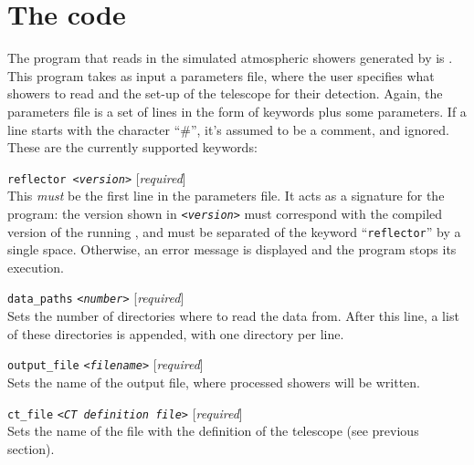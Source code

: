 \afterpage{\clearpage}

\clearpage

\section{The code }
\label{sec:reflector}
%
The program that reads in the simulated atmospheric showers generated
by \CORSIKA is . This program takes as input a parameters
file, where the user specifies what showers to read and the set-up of
the telescope for their detection. Again, the parameters file is a set
of lines in the form of keywords plus some parameters. If a line
starts with the character ``\#'', it's assumed to be a comment, and
ignored. These are the currently supported keywords:

\begin{Uentry}
  
\item[\texttt{reflector <\emph{version}>}]
%
  [\emph{required}] \\
  This \emph{must} be the first line in the parameters file. It acts
  as a signature for the program: the version shown in
  \texttt{<\emph{version}>} must correspond with the compiled version
  of the running , and must be separated of the keyword
  ``\texttt{reflector}'' by a single space.  Otherwise, an error
  message is displayed and the program stops its execution.
  
\item[\texttt{data\_paths} \quad
  \texttt{<\emph{number}>}]
%
  [\emph{required}] \\
  Sets the number of directories where to read the data from. After
  this line, a list of these directories is appended, with one
  directory per line.

\item[\texttt{output\_file} \quad
  \texttt{<\emph{filename}>}]
%
  [\emph{required}] \\
  Sets the name of the output file, where processed showers will be
  written.

\item[\texttt{ct\_file} \quad
  \texttt{<\emph{CT definition file}>}]
%
  [\emph{required}] \\
  Sets the name of the file with the definition of the telescope (see
  previous section).


\end{Uentry}
